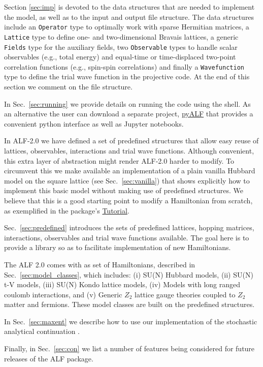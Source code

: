 Section \ref{sec:imp} is devoted to the data structures that are needed to implement the model, as well as to the input and output file structure.   
The data structures include an \texttt{Operator} type to optimally work with sparse Hermitian matrices,
a \texttt{Lattice} type  to define one- and two-dimensional Bravais lattices,
a generic \texttt{Fields} type for the auxiliary fields,
two \texttt{Observable} types to handle scalar observables (e.g., total energy) and equal-time or time-displaced two-point correlation functions (e.g., spin-spin correlations) and finally a \texttt{Wavefunction} type  to define the trial wave function in the projective code.
At the end of this section we comment on the file structure.

In Sec.~\ref{sec:running}   we provide details on running the code  using the shell.  As an alternative the user can download a separate project, \href{https://git.physik.uni-wuerzburg.de/ALF/pyALF}{pyALF}   that provides a convenient python interface as well as  Jupyter  notebooks. 

In ALF-2.0  we have defined a set of predefined structures that allow easy reuse of lattices, observables, interactions and trial wave functions.   Although convenient, this extra layer of abstraction might 
render ALF-2.0  harder to modify. To circumvent this we make available an implementation of a plain vanilla Hubbard model on the square lattice (see Sec.~\ref{sec:vanilla}) that shows explicitly how to implement this basic model without making use of predefined structures.  We believe that this is a good starting point to modify a Hamiltonian from scratch, as exemplified in the package's \href{https://git.physik.uni-wuerzburg.de/ALF/ALF_Tutorial}{Tutorial}. 

Sec.~\ref{sec:predefined}   introduces the sets of predefined lattices,  hopping matrices,  interactions, observables and trial wave functions available.  The goal here is to provide a 
library  so as to facilitate  implementation of new  Hamiltonians. 

The ALF 2.0  comes with as set of Hamiltonians, described in Sec.~\ref{sec:model_classes}, which includes: (i) SU(N) Hubbard models, (ii) SU(N) t-V models, (iii) SU(N) Kondo lattice models, (iv)    Models with long ranged coulomb interactions, and (v) Generic $Z_2$ lattice gauge theories coupled to $Z_2$ matter and fermions.  These model classes are built on the predefined structures. 

In Sec.~\ref{sec:maxent}  we  describe how to use our implementation of the stochastic analytical  continuation \cite{Sandvik98,Beach04a}.

Finally, in Sec.~\ref{sec:con} we list a number of features being considered for  future releases of the ALF package.
